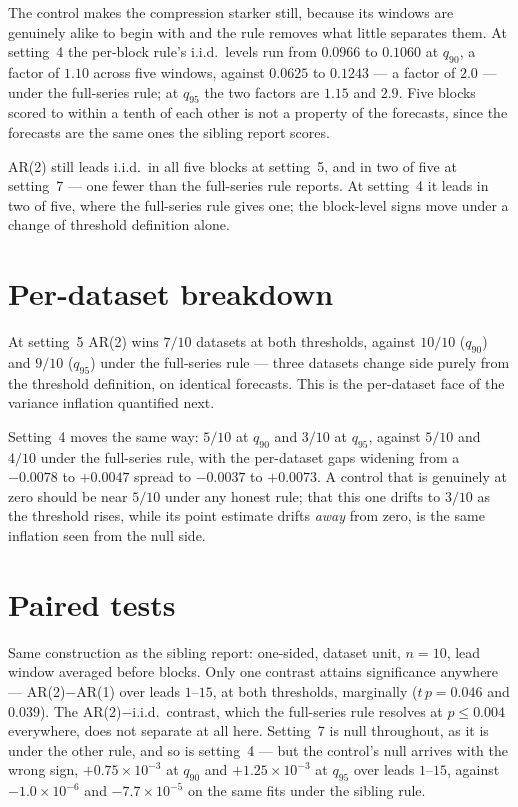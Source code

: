 \documentclass[11pt]{article}
\newcommand{\tblpath}{../../code/analysis/time_block_forecast/simstudy/output/tables}
\newcommand{\tbl}[1]{}
\begin{document}
The control makes the compression starker still, because its windows are
genuinely alike to begin with and the rule removes what little separates
them. At setting~4 the per-block rule's i.i.d.\ levels run from $0.0966$
to $0.1060$ at $q_{90}$, a factor of $1.10$ across five windows, against
$0.0625$ to $0.1243$ --- a factor of $2.0$ --- under the full-series rule;
at $q_{95}$ the two factors are $1.15$ and $2.9$. Five blocks scored to
within a tenth of each other is not a property of the forecasts, since
the forecasts are the same ones the sibling report scores.

AR(2) still leads i.i.d.\ in all five blocks at setting~5, and in two of
five at setting~7 --- one fewer than the full-series rule reports. At
setting~4 it leads in two of five, where the full-series rule gives one;
the block-level signs move under a change of threshold definition alone.

\section{Per-dataset breakdown}

\tbl{expA_dataset_blockq}

\noindent At setting~5 AR(2) wins $7/10$ datasets at both thresholds,
against $10/10$ ($q_{90}$) and $9/10$ ($q_{95}$) under the full-series
rule --- three datasets change side purely from the threshold
definition, on identical forecasts. This is the per-dataset face of the
variance inflation quantified next.

Setting~4 moves the same way: $5/10$ at $q_{90}$ and $3/10$ at $q_{95}$,
against $5/10$ and $4/10$ under the full-series rule, with the per-dataset
gaps widening from a $-0.0078$ to $+0.0047$ spread to $-0.0037$ to
$+0.0073$. A control that is genuinely at zero should be near $5/10$
under any honest rule; that this one drifts to $3/10$ as the threshold
rises, while its point estimate drifts \emph{away} from zero, is the same
inflation seen from the null side.

\section{Paired tests}

\tbl{expA_tests_blockq}

\noindent Same construction as the sibling report: one-sided, dataset
unit, $n = 10$, lead window averaged before blocks. Only one contrast
attains significance anywhere --- AR(2)$-$AR(1) over leads $1$--$15$,
at both thresholds, marginally ($t\,p = 0.046$ and $0.039$). The
AR(2)$-$i.i.d.\ contrast, which the full-series rule resolves at
$p \le 0.004$ everywhere, does not separate at all here. Setting~7 is
null throughout, as it is under the other rule, and so is setting~4 ---
but the control's null arrives with the wrong sign, $+0.75 \times 10^{-3}$
at $q_{90}$ and $+1.25 \times 10^{-3}$ at $q_{95}$ over leads $1$--$15$,
against $-1.0 \times 10^{-6}$ and $-7.7 \times 10^{-5}$ on the same fits
under the sibling rule.
\end{document}
